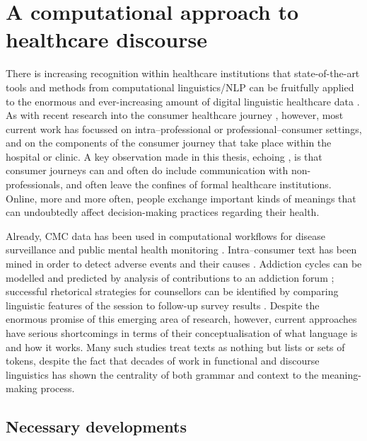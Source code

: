\section{A computational approach to healthcare discourse}

There is increasing recognition within healthcare institutions that state\hyp{}of\hyp{}the\hyp{}art tools and methods from computational linguistics\slash \gls{NLP} can be fruitfully applied to the enormous and ever\hyp{}increasing amount of digital linguistic healthcare data \cite{velupillai2015recent}. As with recent research into the consumer healthcare journey \cite{slade_communicating_2015}, however, most current work has focussed on intra--professional or professional--\gls{consumer} settings, and on the components of the \gls{consumer} journey that take place within the hospital or clinic. A key observation made in this thesis, echoing \textcite{jones_health_2013}, is that consumer journeys can and often do include communication with non\hyp{}professionals, and often leave the confines of formal healthcare institutions. Online, more and more often, people exchange important kinds of meanings that can undoubtedly affect decision\hyp{}making practices regarding their health.

Already, \gls{CMC} data has been used in computational workflows for disease surveillance \cite{kim_use_2013} and public mental health monitoring \cite{paul_social_2016}. Intra--consumer text has been mined in order to detect adverse events and their causes \cite{chee2011predicting}. Addiction cycles can be modelled and predicted by analysis of contributions to an addiction \gls{forum} \cite{maclean_forum77:_2015}; successful rhetorical strategies for counsellors can be identified by comparing linguistic features of the session to follow\hyp{}up survey results \cite{althoff_counseling_2016}. Despite the enormous promise of this emerging area of research, however, current approaches have serious shortcomings in terms of their conceptualisation of what language is and how it works. Many such studies treat texts as nothing but lists or sets of tokens, despite the fact that decades of work in functional and discourse linguistics has shown the centrality of both grammar and context to the meaning\hyp{}making process.

\subsection{Necessary developments}

